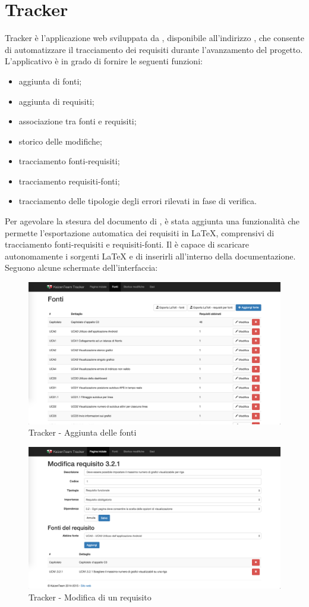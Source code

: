 \section{Tracker} \label{sec:tracker}

Tracker è l'applicazione web sviluppata da \groupname{}, disponibile all'indirizzo , che consente di automatizzare il tracciamento dei requisiti durante l’avanzamento del progetto. \\
L'applicativo è in grado di fornire le seguenti funzioni:
\begin{itemize}
	\item aggiunta di fonti;
	\item aggiunta di requisiti;
	\item associazione tra fonti e requisiti;
	\item storico delle modifiche;
	\item tracciamento fonti-requisiti;
	\item tracciamento requisiti-fonti;
	\item tracciamento delle tipologie degli errori rilevati in fase di verifica.
\end{itemize}

Per agevolare la stesura del documento di , è stata aggiunta una funzionalità che permette l’esportazione automatica dei requisiti in \LaTeX, comprensivi di tracciamento fonti-requisiti e requisiti-fonti. Il  è capace di scaricare autonomamente i sorgenti \LaTeX{} e di inserirli all’interno della documentazione. \\
Seguono alcune schermate dell’interfaccia:

\begin{figure}[H]
	\centering
	\includegraphics[width=\textwidth]{Pics/TrackerFonti}
	\caption{Tracker - Aggiunta delle fonti}
\end{figure}


\begin{figure}[H]
	\centering
	\includegraphics[width=\textwidth]{Pics/TrackerModificaRequisito}
	\caption{Tracker - Modifica di un requisito}
\end{figure}